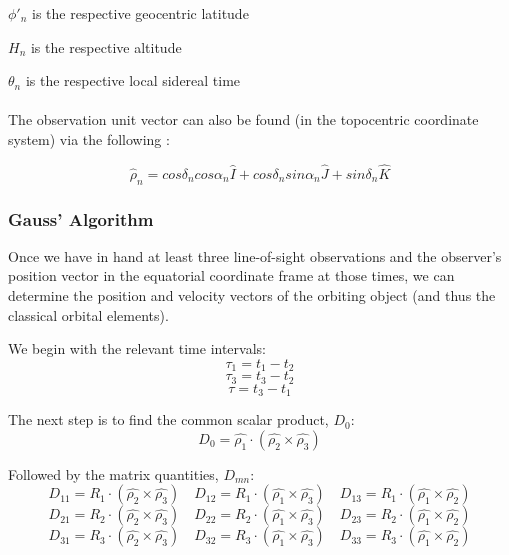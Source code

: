 \documentclass[11pt,twoside,letterpaper]{article}
\begin{document}
  \(\phi'_n\) is the respective geocentric latitude
  
  \(H_n\) is the respective altitude
  
  \(\theta_n\) is the respective local sidereal time

  \paragraph{}
  
  The observation unit vector can also be found (in the topocentric
  coordinate system) via the following  \cite{Wikipedia_2018}:

  \begin{equation}\label{losVec}
    \hat{\rho}_n = cos\delta_ncos\alpha_n\hat{I}
    + cos\delta_nsin\alpha_n\hat{J} + sin\delta_n\hat{K}
  \end{equation}

  \subsubsection{Gauss' Algorithm}
  Once we have in hand at least three line-of-sight observations and
  the observer's position vector in the equatorial coordinate frame at
  those times, we can determine the position and velocity vectors of
  the orbiting object (and thus the classical orbital elements).

  We begin with the relevant time intervals:
  \begin{equation}
    \tau_1 = t_1 - t_2
  \end{equation}
  \begin{equation}
    \tau_3 = t_3 - t_2
  \end{equation}
  \begin{equation}
    \tau = t_3 - t_1
  \end{equation}

  The next step is to find the common scalar product, $D_0$:
  \begin{equation}
    D_0 = \hat{\rho_1}\cdot(\hat{\rho_2}\times\hat{\rho_3})
  \end{equation}

  Followed by the matrix quantities, $D_{mn}$:
  \begin{equation}
    D_{11} = R_1\cdot(\hat{\rho_2}\times\hat{\rho_3})
    \quad D_{12} = R_1\cdot(\hat{\rho_1}\times\hat{\rho_3})
    \quad D_{13} = R_1\cdot(\hat{\rho_1}\times\hat{\rho_2})
  \end{equation}
  \begin{equation}
    D_{21} = R_2\cdot(\hat{\rho_2}\times\hat{\rho_3})
    \quad D_{22} = R_2\cdot(\hat{\rho_1}\times\hat{\rho_3})
    \quad D_{23} = R_2\cdot(\hat{\rho_1}\times\hat{\rho_2})
  \end{equation}
  \begin{equation}
    D_{31} = R_3\cdot(\hat{\rho_2}\times\hat{\rho_3})
    \quad D_{32} = R_3\cdot(\hat{\rho_1}\times\hat{\rho_3})
    \quad D_{33} = R_3\cdot(\hat{\rho_1}\times\hat{\rho_2})
  \end{equation}
\end{document}
